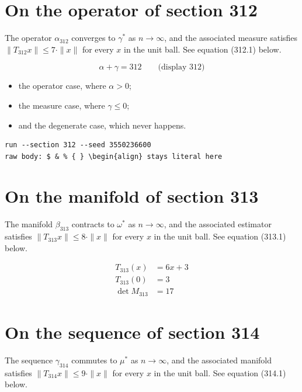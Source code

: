 \documentclass{article}
\begin{document}
\section{On the operator of section 312}
The operator $\alpha_{312}$ converges to $\gamma^{*}$ as $n \to \infty$,
and the associated measure satisfies $\|T_{312} x\| \leq 7 \cdot \|x\|$
for every $x$ in the unit ball. See equation (312.1) below.

$$
\alpha + \gamma = 312 \qquad \text{(display 312)}
$$

\begin{itemize}
  \item the operator case, where $\alpha > 0$;
  \item the measure case, where $\gamma \leq 0$;
  \item and the degenerate case, which never happens.
\end{itemize}

\begin{verbatim}
run --section 312 --seed 3550236600
raw body: $ & % { } \begin{align} stays literal here
\end{verbatim}

\section{On the manifold of section 313}
The manifold $\beta_{313}$ contracts to $\omega^{*}$ as $n \to \infty$,
and the associated estimator satisfies $\|T_{313} x\| \leq 8 \cdot \|x\|$
for every $x$ in the unit ball. See equation (313.1) below.

\begin{align}
T_{313}(x) &= 6 x + 3 \\
T_{313}(0) &= 3 \\
\det M_{313} &= 17
\end{align}

\section{On the sequence of section 314}
The sequence $\gamma_{314}$ commutes to $\mu^{*}$ as $n \to \infty$,
and the associated manifold satisfies $\|T_{314} x\| \leq 9 \cdot \|x\|$
for every $x$ in the unit ball. See equation (314.1) below.
\end{document}
